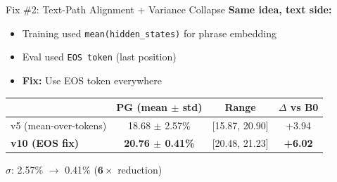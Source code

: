 \documentclass[aspectratio=169,12pt]{beamer}
\newcommand{\plus}[1]{{\color{positive}+#1}}
\begin{document}
\begin{frame}{Fix \#2: Text-Path Alignment + Variance Collapse}
  \textbf{Same idea, text side:}
  \begin{itemize}
    \item Training used \texttt{mean(hidden\_states)} for phrase embedding
    \item Eval used \texttt{EOS token} (last position)
    \item \textbf{Fix:} Use EOS token everywhere
  \end{itemize}

  \vspace{0.5em}
  \begin{center}
    \begin{tabular}{l c c c}
      \toprule
      & PG (mean $\pm$ std) & Range & $\Delta$ vs B0 \\
      \midrule
      v5 (mean-over-tokens) & 18.68 $\pm$ 2.57\% & [15.87, 20.90] & \plus{3.94} \\
      \textbf{v10 (EOS fix)} & \textbf{20.76 $\pm$ 0.41\%} & [20.48, 21.23] & \textbf{\plus{6.02}} \\
      \bottomrule
    \end{tabular}
  \end{center}

  \vspace{0.5em}
  \begin{center}
    {\Large $\sigma$: 2.57\% $\longrightarrow$ 0.41\% \quad ($\mathbf{6\times}$ reduction)}
  \end{center}
\end{frame}
\end{document}

